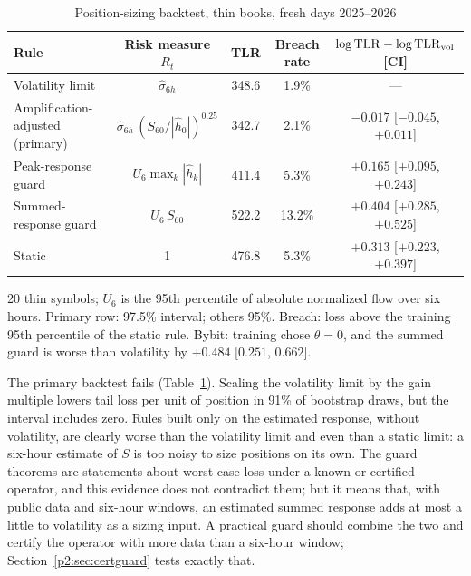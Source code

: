 \begin{table}[t]\centering\small
\begin{threeparttable}
\caption{Position-sizing backtest, thin books, fresh days 2025--2026}\label{p2:tab:backtest}
\begin{tabular}{lcccc}
\toprule
Rule & Risk measure $R_t$ & TLR & Breach rate & $\log{\rm TLR}-\log{\rm TLR}_{\rm vol}$ [CI]\\
\midrule
Volatility limit & $\hat\sigma_{6h}$ & 348.6 & 1.9\% & ---\\
Amplification-adjusted (primary) & $\hat\sigma_{6h}\,(S_{60}/|\hat h_0|)^{0.25}$ & 342.7 & 2.1\% & $-0.017$ [$-0.045$, $+0.011$]\\
Peak-response guard & $U_6\max_k|\hat h_k|$ & 411.4 & 5.3\% & $+0.165$ [$+0.095$, $+0.243$]\\
Summed-response guard & $U_6\,S_{60}$ & 522.2 & 13.2\% & $+0.404$ [$+0.285$, $+0.525$]\\
Static & 1 & 476.8 & 5.3\% & $+0.313$ [$+0.223$, $+0.397$]\\
\bottomrule
\end{tabular}
\begin{tablenotes}\footnotesize\item 20 thin symbols; $U_6$ is the 95th percentile of absolute normalized flow over six hours. Primary row: 97.5\% interval; others 95\%. Breach: loss above the training 95th percentile of the static rule. Bybit: training chose $\theta=0$, and the summed guard is worse than volatility by $+0.484$ [$0.251$, $0.662$]. \end{tablenotes}
\end{threeparttable}
\end{table}

The primary backtest fails (Table~\ref{p2:tab:backtest}). Scaling the volatility limit by the gain multiple lowers tail loss per unit of position in 91\% of bootstrap draws, but the interval includes zero. Rules built only on the estimated response, without volatility, are clearly worse than the volatility limit and even than a static limit: a six-hour estimate of $S$ is too noisy to size positions on its own. The guard theorems are statements about worst-case loss under a known or certified operator, and this evidence does not contradict them; but it means that, with public data and six-hour windows, an estimated summed response adds at most a little to volatility as a sizing input. A practical guard should combine the two and certify the operator with more data than a six-hour window; Section~\ref{p2:sec:certguard} tests exactly that.


